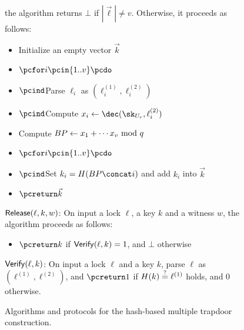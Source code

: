 \begin{figure*}[htb]
\begin{center}
{\begin{minipage}[t]{0.75\textwidth}
			the algorithm returns $\bot$ if $|\vec{\ell}| \neq v$. Otherwise, it proceeds as 
			follows:
			\begin{itemize}[label=-]
				\item Initialize an empty vector $\vec{k}$
				\item $\pcfor i \pcin \{1..v\} \pcdo$
				\item $\pcind$Parse $\ell_i$ as $(\ell_i^{(1)},\ell_i^{(2)})$
				\item $\pcind$Compute $x_i \gets \dec(\sk_{U_r},\ell_i^{(2)})$
				\item Compute $BP \gets x_1 + \cdots x_v \ \mathrm{mod}\ q$
				\item $\pcfor i \pcin \{1..v\} \pcdo$
				\item $\pcind$Set $k_i = H(BP \concat i)$ and add $k_i$ into 
				$\vec{k}$
				\item $\pcreturn \vec{k}$
			\end{itemize}
			\underline{$\mathsf{Release}(\ell, k, w)$}: On input a lock $\ell$, a key $k$ and 
			a witness $w$, the algorithm proceeds as follows:
			\begin{itemize}[label=-]
				\item $\pcreturn k$ if $\mathsf{Verify}(\ell, k) = 1$, and $\bot$ otherwise
			\end{itemize}
			\underline{$\mathsf{Verify}(\ell, k)$}: On input a lock $\ell$ and a key $k$, 
			parse $\ell$ as $(\ell^{(1)},\ell^{(2)})$, and $\pcreturn 1$ if $H(k) \stackrel{?}{=} 
			\ell^{(1)}$ holds, and 0 otherwise.
		\end{minipage}
	}
	\end{center}
	
	\caption{Algorithms and protocols for the hash-based multiple trapdoor construction.}
	\label{fig:single-trapdoor}
\end{figure*}
